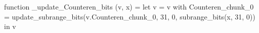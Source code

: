 function _update_Counteren_bits (v, x) = let v = { v with Counteren_chunk_0 = update_subrange_bits(v.Counteren_chunk_0, 31, 0, subrange_bits(x, 31, 0)) } in
  v
